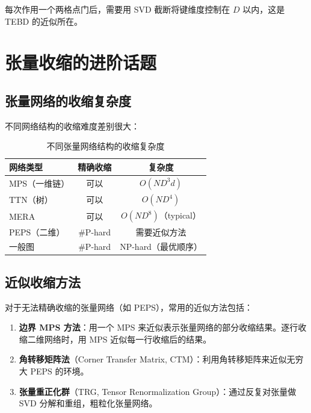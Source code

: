 \documentclass[12pt,a4paper]{ctexart}
\begin{document}
每次作用一个两格点门后，需要用 SVD 截断将键维度控制在 $D$ 以内，这是 TEBD 的近似所在。

\section{张量收缩的进阶话题}

\subsection{张量网络的收缩复杂度}

不同网络结构的收缩难度差别很大：

\begin{table}[H]
\centering
\begin{tabular}{lcc}
\toprule
\textbf{网络类型} & \textbf{精确收缩} & \textbf{复杂度} \\
\midrule
MPS（一维链） & 可以 & $O(ND^3 d)$ \\
TTN（树） & 可以 & $O(ND^4)$ \\
MERA & 可以 & $O(ND^8)$（typical） \\
PEPS（二维） & \#P-hard & 需要近似方法 \\
一般图 & \#P-hard & NP-hard（最优顺序） \\
\bottomrule
\end{tabular}
\caption{不同张量网络结构的收缩复杂度}
\end{table}

\subsection{近似收缩方法}

对于无法精确收缩的张量网络（如 PEPS），常用的近似方法包括：

\begin{enumerate}
    \item \textbf{边界 MPS 方法}：用一个 MPS 来近似表示张量网络的部分收缩结果。逐行收缩二维网络时，用 MPS 近似每一行收缩后的结果。

    \item \textbf{角转移矩阵法}（Corner Transfer Matrix, CTM）：利用角转移矩阵来近似无穷大 PEPS 的环境。

    \item \textbf{张量重正化群}（TRG, Tensor Renormalization Group）：通过反复对张量做 SVD 分解和重组，粗粒化张量网络。
\end{enumerate}
\end{document}
